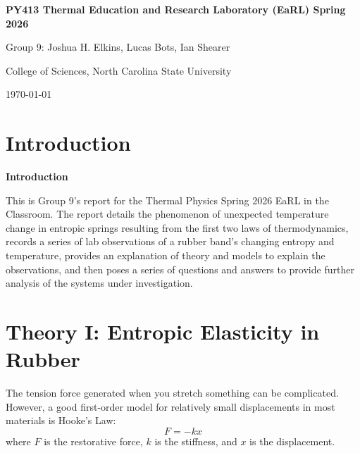 \documentclass[12pt]{article}     %
\makeatletter
\newenvironment{intro}{%
    \if@twocolumn
      \section*{Introduction}%
    \else
      \small
      \begin{center}%
        {\bfseries Introduction\par}%
      \end{center}%
      \quotation
    \fi
}{%
    \if@twocolumn\else\endquotation\fi
}
\makeatother
\begin{document}
\begin{center}
    {\LARGE\bfseries PY413 Thermal Education and Research Laboratory (EaRL) Spring 2026\par}
    \vspace{1.5em}
    {\large Group 9: Joshua H. Elkins, Lucas Bots, Ian Shearer\par}
    \vspace{0.5em}
    {\normalsize College of Sciences, North Carolina State University\par}
    \vspace{0.5em}
    {\normalsize \today\par}
\end{center}

\begin{intro}
    This is Group 9's report for the Thermal Physics Spring 2026 EaRL in the Classroom.  The report details the phenomenon of unexpected temperature change in entropic springs resulting from the first two laws of thermodynamics, records a series of lab observations of a rubber band's changing entropy and temperature, provides an explanation of theory and models to explain the observations, and then poses a series of questions and answers to provide further analysis of the systems under investigation.
\end{intro}

\tableofcontents
\setcounter{tocdepth}{1}


\newpage %
\pagestyle{fancy} %
\fancyhead[r]{\today} %
\fancyfoot[c]{\thepage}
\renewcommand{\headrulewidth}{0.2pt} %
\setlength{\headheight}{15pt} %

\section{Theory I: Entropic Elasticity in Rubber}

The tension force generated when you stretch something can be complicated. However, a good first-order model for relatively small displacements in most materials is Hooke's Law:
    $$F = -kx$$
where $F$ is the restorative force, $k$ is the stiffness, and $x$ is the displacement.
\end{document}
